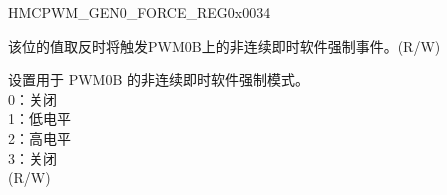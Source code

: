 \addtocounter{Regfloat}{-1}
\begin{register}{H}{MCPWM\_GEN0\_FORCE\_REG}{0x0034}
\begin{regdesc}\begin{reglist}
\item [...接上页]
\label{fielddesc:MCPWMGEN0BNCIFORCE}\item [MCPWM\_GEN0\_B\_NCIFORCE] 该位的值取反时将触发PWM0B上的非连续即时软件强制事件。(R/W)
\label{fielddesc:MCPWMGEN0BNCIFORCEMODE}\item [MCPWM\_GEN0\_B\_NCIFORCE\_MODE] 设置用于 PWM0B 的非连续即时软件强制模式。\\0：关闭\\1：低电平\\2：高电平\\3：关闭\\ (R/W)
\end{reglist}\end{regdesc}
\end{register}


